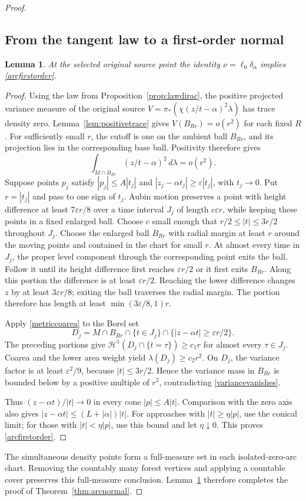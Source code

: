\documentclass[11pt]{article}
\newtheorem{lemma}[theorem]{Lemma}
\newcommand{\HH}{\mathcal H}
\begin{document}
\begin{proof}
\subsection{From the tangent law to a first-order normal}
\begin{lemma}\label{lem:variance}
At the selected original source point the identity $\nu=\ell_0\delta_\alpha$ implies \eqref{arcfirstorder}.
\end{lemma}
\begin{proof}
Using the law from Proposition~\ref{prop:lawdirac}, the positive projected variance measure of the original source
$V=\pi_*(\chi(z/t-\alpha)^2\lambda)$ has trace density zero. Lemma~\ref{lem:positivetrace} gives $V(B_{Rr})=o(r^2)$ for each fixed $R$. For sufficiently small $r$, the cutoff is one on the ambient ball $B_{Rr}$, and its projection lies in the corresponding base ball. Positivity therefore gives
\begin{equation}\label{variancevanishes}
 \int_{M\cap B_{Rr}}(z/t-\alpha)^2\,d\lambda=o(r^2).
\end{equation}
Suppose points $p_j$ satisfy $|p_j|\le A|t_j|$ and $|z_j-\alpha t_j|\ge\varepsilon|t_j|$, with $t_j\to0$. Put $r=|t_j|$ and pass to one sign of $t_j$. Aubin motion preserves a point with height difference at least $7\varepsilon r/8$ over a time interval $J_j$ of length $c\varepsilon r$, while keeping these points in a fixed enlarged ball. Choose $c$ small enough that $r/2\le|t|\le3r/2$ throughout $J_j$. Choose the enlarged ball $B_{Rr}$ with radial margin at least $r$ around the moving points and contained in the chart for small $r$. At almost every time in $J_j$, the proper level component through the corresponding point exits the ball. Follow it until its height difference first reaches $\varepsilon r/2$ or it first exits $B_{Rr}$. Along this portion the difference is at least $\varepsilon r/2$. Reaching the lower difference changes $z$ by at least $3\varepsilon r/8$; exiting the ball traverses the radial margin. The portion therefore has length at least $\min(3\varepsilon/8,1)r$.

Apply \eqref{metriccoarea} to the Borel set
\[
 D_j=M\cap B_{Rr}\cap\{t\in J_j\}
       \cap\{|z-\alpha t|\ge\varepsilon r/2\}.
\]
The preceding portions give $\HH^1(D_j\cap\{t=\tau\})\ge c_1r$ for almost every $\tau\in J_j$. Coarea and the lower area weight yield $\lambda(D_j)\ge c_2r^2$. On $D_j$, the variance factor is at least $\varepsilon^2/9$, because $|t|\le3r/2$. Hence the variance mass in $B_{Rr}$ is bounded below by a positive multiple of $r^2$, contradicting \eqref{variancevanishes}.

Thus $(z-\alpha t)/|t|\to0$ in every cone $|p|\le A|t|$. Comparison with the zero axis also gives $|z-\alpha t|\le(L+|\alpha|)|t|$. For approaches with $|t|\ge\eta|p|$, use the conical limit; for those with $|t|<\eta|p|$, use this bound and let $\eta\downarrow0$. This proves \eqref{arcfirstorder}.
\end{proof}
The simultaneous density points form a full-measure set in each isolated-zero-arc chart. Removing the countably many forest vertices and applying a countable cover preserves this full-measure conclusion. Lemma~\ref{lem:variance} therefore completes the proof of Theorem~\ref{thm:arcnormal}.
\end{proof}
\end{document}
